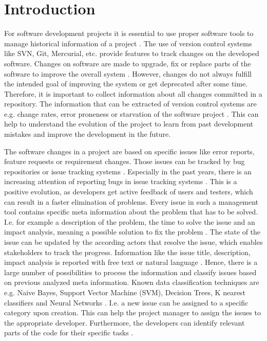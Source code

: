 \section{Introduction}
\label{sec:introduction}

For software development projects it is essential to use proper software tools to manage historical information of a project \cite{fischer2003populating}. The use of version control systems like SVN, Git, Mercurial, etc. provide features to track changes on the developed software. Changes on software are made to upgrade, fix or replace parts of the software to improve the overall system \cite{janak2009issue}. However, changes do not always fulfill the intended goal of improving the system or get deprecated after some time. Therefore, it is important to collect information about all changes committed in a repository. The information that can be extracted of version control systems are e.g. change rates, error proneness or starvation of the software project \cite{fischer2003populating}. This can help to understand the evolution of the project to learn from past development mistakes and improve the development in the future.

The software changes in a project are based on specific issues like error reports, feature requests or requirement changes. Those issues can be tracked by bug repositories or issue tracking systems \cite{fischer2003populating}. Especially in the past years, there is an increasing attention of reporting bugs in issue tracking systems \cite{ahmedpredicting}. This is a positive evolution, as developers get active feedback of users and testers, which can result in a faster elimination of problems. 
Every issue in such a management tool contains specific meta information about the problem that has to be solved. I.e. for example a description of the problem, the time to solve the issue and an impact analysis, meaning a possible solution to fix the problem \cite{fischer2003populating}. The state of the issue can be updated by the according actors that resolve the issue, which enables stakeholders to track the progress. Information like the issue title, description, impact analysis is reported with free text or natural language \cite{ahmedpredicting}. Hence, there is a large number of possibilities to process the information and classify issues based on previous analyzed meta information. Known data classification techniques are e.g. Naive Bayes, Support Vector Machine (SVM), Decision Trees, K nearest classifiers and Neural Networks \cite{ahmedpredicting}\cite{lancaster2003indexing}. I.e. a new issue can be assigned to a specific category upon creation. This can help the project manager to assign the issues to the appropriate developer. Furthermore, the developers can identify relevant parts of the code for their specific tasks \cite{ying2004predicting}.

